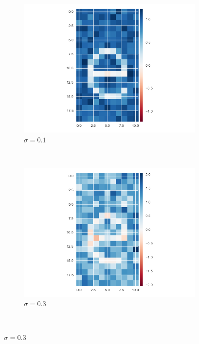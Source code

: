\documentclass[10pt,twocolumn,letterpaper]{article}
\begin{document}
\begin{figure}
    \centering
    \begin{subfigure}[b]{0.22\textwidth}
        \includegraphics[width=\textwidth]{10.png}
        \caption{$\sigma = 0.1$}
    \end{subfigure}
    ~ %
    \begin{subfigure}[b]{0.22\textwidth}
        \includegraphics[width=\textwidth]{30.png}
        \caption{$\sigma = 0.3$}
    \end{subfigure}
    ~ %


\end{figure}
\end{document}
